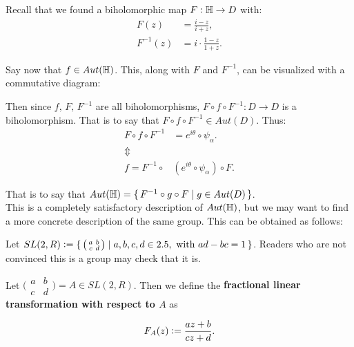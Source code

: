 Recall that we found a biholomorphic map $F:\mathbb{H} \to D$ with:
\begin{align*}
    F(z) &= \frac{i-z}{i+z},\\
    F^{-1} (z) &= i \cdot \frac{1-z}{1+z}.
\end{align*}

Say now that $f \in Aut(\mathbb{H})$. This, along with $F$ and $F^{-1}$, can be visualized with a commutative diagram:
\begin{center}
\end{center}

Then since $f, \, F, \, F^{-1}$ are all biholomorphisms, $F \circ f \circ F^{-1} : D \to D$ is a biholomorphism. That is to say that $F \circ f \circ F^{-1} \in Aut(D)$. Thus:
\begin{align*}
F \circ f \circ F^{-1} &= e^{i \theta} \circ \psi_\alpha.\\
\Updownarrow\\
f = F^{-1} \circ &\left( e^{i \theta} \circ \psi_\alpha \right) \circ F.
\end{align*}

That is to say that $Aut(\mathbb{H}) = \set{ F^{-1} \circ g \circ F \mid g \in Aut(D) }$.\\

This is a completely satisfactory description of $Aut(\mathbb{H})$, but we may want to find a more concrete description of the same group. This can be obtained as follows:

Let $SL(2,R) \vcentcolon = \set{ \big(\begin{smallmatrix}
  a & b\\
  c & d
\end{smallmatrix}\big) \mid a,b,c,d \in 2.5, \text{ with } ad-bc=1  }$. Readers who are not convinced this is a group may check that it is. 


\begin{definition}
Let $\big(\begin{smallmatrix}
  a & b\\
  c & d
\end{smallmatrix}\big) = A \in SL(2,R)$. Then we define the \textbf{fractional linear transformation with respect to $A$} as

\begin{align*}
    F_A(z) \vcentcolon = \frac{az+ b}{cz+d}.
\end{align*}
\end{definition}

